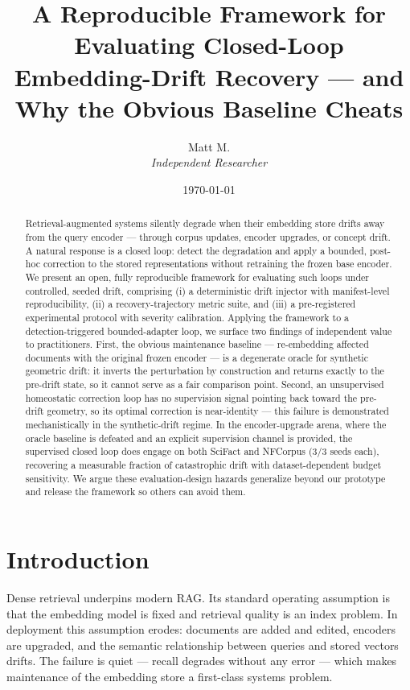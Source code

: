 \documentclass[12pt]{article}
\title{A Reproducible Framework for Evaluating Closed-Loop\\
Embedding-Drift Recovery --- and Why the Obvious Baseline Cheats}
\author{Matt M.\\\textit{Independent Researcher}}
\date{\today}
\begin{document}
\maketitle

\begin{abstract}
Retrieval-augmented systems silently degrade when their embedding store drifts away from the query encoder --- through corpus updates, encoder upgrades, or concept drift. A natural response is a closed loop: detect the degradation and apply a bounded, post-hoc correction to the stored representations without retraining the frozen base encoder. We present an open, fully reproducible framework for evaluating such loops under controlled, seeded drift, comprising (i) a deterministic drift injector with manifest-level reproducibility, (ii) a recovery-trajectory metric suite, and (iii) a pre-registered experimental protocol with severity calibration. Applying the framework to a detection-triggered bounded-adapter loop, we surface two findings of independent value to practitioners. First, the obvious maintenance baseline --- re-embedding affected documents with the original frozen encoder --- is a degenerate oracle for synthetic geometric drift: it inverts the perturbation by construction and returns exactly to the pre-drift state, so it cannot serve as a fair comparison point. Second, an unsupervised homeostatic correction loop has no supervision signal pointing back toward the pre-drift geometry, so its optimal correction is near-identity --- this failure is demonstrated mechanistically in the synthetic-drift regime. In the encoder-upgrade arena, where the oracle baseline is defeated and an explicit supervision channel is provided, the supervised closed loop does engage on both SciFact and NFCorpus (3/3 seeds each), recovering a measurable fraction of catastrophic drift with dataset-dependent budget sensitivity. We argue these evaluation-design hazards generalize beyond our prototype and release the framework so others can avoid them.
\end{abstract}

\section{Introduction}
\label{sec:intro}

Dense retrieval underpins modern RAG. Its standard operating assumption is that the embedding model is fixed and retrieval quality is an index problem. In deployment this assumption erodes: documents are added and edited, encoders are upgraded, and the semantic relationship between queries and stored vectors drifts. The failure is quiet --- recall degrades without any error --- which makes maintenance of the embedding store a first-class systems problem.
\end{document}
